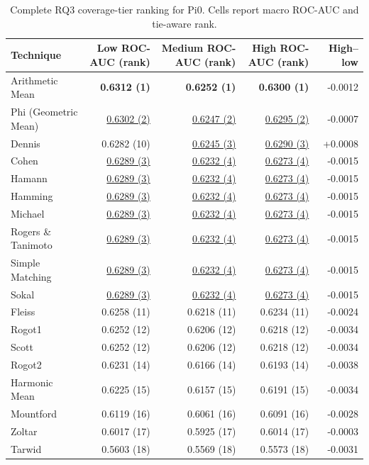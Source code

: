 \begin{table}[t]
\centering
\caption{Complete RQ3 coverage-tier ranking for Pi0. Cells report macro ROC-AUC and tie-aware rank.}
\label{tab:rq3-supplementary-rankings-pi0}
{\scriptsize
\setlength{\tabcolsep}{5pt}
\begin{tabular}{lrrrr}
\toprule
Technique & Low ROC-AUC (rank) & Medium ROC-AUC (rank) & High ROC-AUC (rank) & High--low \\
\midrule
Arithmetic Mean & \textbf{0.6312 (1)} & \textbf{0.6252 (1)} & \textbf{0.6300 (1)} & -0.0012 \\
Phi (Geometric Mean) & \underline{0.6302 (2)} & \underline{0.6247 (2)} & \underline{0.6295 (2)} & -0.0007 \\
Dennis & 0.6282 (10) & \underline{0.6245 (3)} & \underline{0.6290 (3)} & +0.0008 \\
Cohen & \underline{0.6289 (3)} & \underline{0.6232 (4)} & \underline{0.6273 (4)} & -0.0015 \\
Hamann & \underline{0.6289 (3)} & \underline{0.6232 (4)} & \underline{0.6273 (4)} & -0.0015 \\
Hamming & \underline{0.6289 (3)} & \underline{0.6232 (4)} & \underline{0.6273 (4)} & -0.0015 \\
Michael & \underline{0.6289 (3)} & \underline{0.6232 (4)} & \underline{0.6273 (4)} & -0.0015 \\
Rogers \& Tanimoto & \underline{0.6289 (3)} & \underline{0.6232 (4)} & \underline{0.6273 (4)} & -0.0015 \\
Simple Matching & \underline{0.6289 (3)} & \underline{0.6232 (4)} & \underline{0.6273 (4)} & -0.0015 \\
Sokal & \underline{0.6289 (3)} & \underline{0.6232 (4)} & \underline{0.6273 (4)} & -0.0015 \\
Fleiss & 0.6258 (11) & 0.6218 (11) & 0.6234 (11) & -0.0024 \\
Rogot1 & 0.6252 (12) & 0.6206 (12) & 0.6218 (12) & -0.0034 \\
Scott & 0.6252 (12) & 0.6206 (12) & 0.6218 (12) & -0.0034 \\
Rogot2 & 0.6231 (14) & 0.6166 (14) & 0.6193 (14) & -0.0038 \\
Harmonic Mean & 0.6225 (15) & 0.6157 (15) & 0.6191 (15) & -0.0034 \\
Mountford & 0.6119 (16) & 0.6061 (16) & 0.6091 (16) & -0.0028 \\
Zoltar & 0.6017 (17) & 0.5925 (17) & 0.6014 (17) & -0.0003 \\
Tarwid & 0.5603 (18) & 0.5569 (18) & 0.5573 (18) & -0.0031 \\

\end{tabular}}
\end{table}
